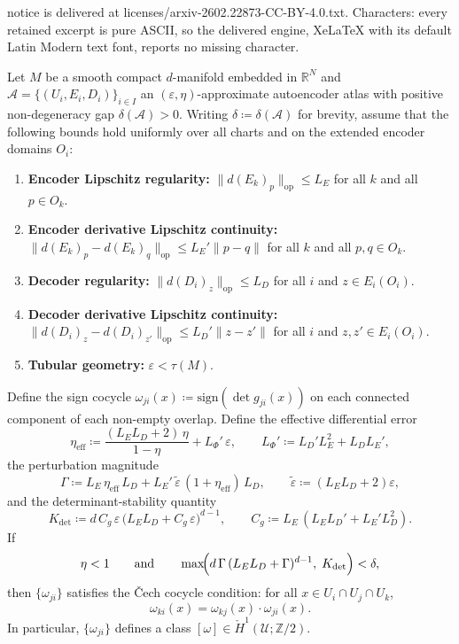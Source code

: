 \documentclass[10pt,a4paper]{amsart}
\newcommand{\R}{\mathbb{R}}
\newcommand{\Z}{\mathbb{Z}}
\newcommand{\sign}{\mathrm{sign}}
\begin{document}
notice is delivered at licenses/arxiv-2602.22873-CC-BY-4.0.txt. Characters: every retained excerpt is pure ASCII, so the delivered engine, XeLaTeX with its default Latin Modern text font, reports no missing character.
\begin{theorem}\label{thm:sign-cocycle-stability}
Let $M$ be a smooth compact $d$-manifold embedded in $\R^N$ and $\mathcal{A} = \{(U_i, E_i, D_i)\}_{i \in I}$ an $(\varepsilon, \eta)$-approximate autoencoder atlas with positive non-degeneracy gap $\delta(\mathcal{A}) > 0$. Writing $\delta \coloneqq \delta(\mathcal{A})$ for brevity, assume that the following bounds hold uniformly over all charts and on the extended encoder domains $O_i$:
\begin{enumerate}[label=(\roman*)]
    \item \textbf{Encoder Lipschitz regularity:} $\| d(E_k)_p \|_{\mathrm{op}} \leq L_E$ for all $k$ and all $p \in O_k$.
    \item \textbf{Encoder derivative Lipschitz continuity:} $\| d(E_k)_p - d(E_k)_q \|_{\mathrm{op}} \leq L_E' \|p - q\|$ for all $k$ and all $p, q \in O_k$.
    \item \textbf{Decoder regularity:} $\| d(D_i)_z \|_{\mathrm{op}} \leq L_D$ for all $i$ and $z \in E_i(O_i)$.
    \item \textbf{Decoder derivative Lipschitz continuity:} $\| d(D_i)_z - d(D_i)_{z'} \|_{\mathrm{op}} \leq L_D' \|z - z'\|$ for all $i$ and $z, z' \in E_i(O_i)$.
    \item \textbf{Tubular geometry:} $\varepsilon < \tau(M)$.
\end{enumerate}
Define the sign cocycle $\omega_{ji}(x) \coloneqq \sign(\det g_{ji}(x))$ on each connected component of each non-empty overlap. Define the effective differential error
\begin{equation}\label{eq:eta-eff-def}
\eta_{\mathrm{eff}} \coloneqq \frac{(L_E L_D + 2)\,\eta}{1 - \eta} + L_\Phi'\,\varepsilon,
\qquad L_\Phi' \coloneqq L_D' L_E^2 + L_D L_E',
\end{equation}
the perturbation magnitude
\begin{equation}\label{eq:Gamma-def}
\Gamma \coloneqq L_E\,\eta_{\mathrm{eff}}\, L_D + L_E'\,\widetilde{\varepsilon}\,(1 + \eta_{\mathrm{eff}})\, L_D,
\qquad \widetilde{\varepsilon} \coloneqq (L_E L_D + 2)\varepsilon,
\end{equation}
and the determinant-stability quantity
\begin{equation}\label{eq:Ldet-def}
K_{\det} \coloneqq d\,C_g\,\varepsilon\,\bigl(L_E L_D + C_g\,\varepsilon\bigr)^{d-1},
\qquad C_g \coloneqq L_E\,(L_E L_D' + L_E' L_D^2).
\end{equation}
If
\begin{equation}\label{eq:stability-condition}
\eta < 1 \qquad \text{and} \qquad \max\!\Bigl(d\,\Gamma\,(L_E L_D + \Gamma)^{d-1},\; K_{\det}\Bigr) < \delta,
\end{equation}
then $\{\omega_{ji}\}$ satisfies the \v{C}ech cocycle condition: for all $x \in U_i \cap U_j \cap U_k$,
\[
\omega_{ki}(x) = \omega_{kj}(x) \cdot \omega_{ji}(x).
\]
In particular, $\{\omega_{ji}\}$ defines a class $[\omega] \in \check{H}^1(\mathcal{U}; \Z/2)$.
\end{theorem}
\end{document}
